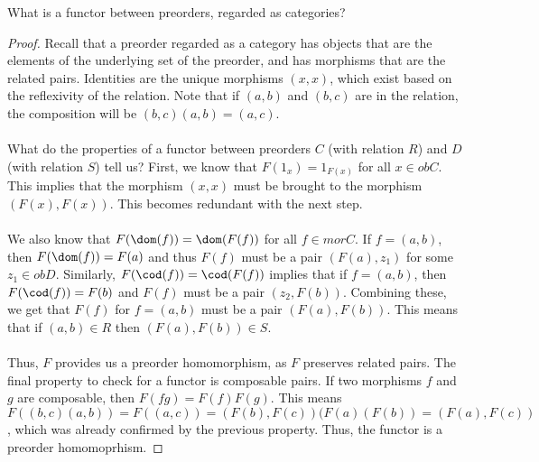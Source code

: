 \documentclass[main.tex]{subfiles}
\begin{document}

\begin{exercise}
	What is a functor between preorders, regarded as categories?
\end{exercise}

\begin{proof}
	Recall that a preorder regarded as a category has objects that are the
	elements of the underlying set of the preorder, and has morphisms that are
	the related pairs.  Identities are the unique morphisms $(x,x)$, which exist
	based on the reflexivity of the relation.  Note that if $(a,b)$ and $(b,c)$
	are in the relation, the composition will be $(b,c)(a,b) = (a,c)$.\\ \\ What
	do the properties of a functor between preorders $C$ (with relation $R$) and
	$D$ (with relation $S$) tell us?  First, we know that $F(1_x) = 1_{F(x)}$
	for all $x \in obC$.  This implies that the morphism $(x,x)$ must be brought
	to the morphism $(F(x),F(x))$.  This becomes redundant with the next step.
	\\ \\ We also know that $F(\dom(f)) = \dom(F(f))$ for all $f \in morC$.  If
	$f = (a,b)$, then $F(\dom(f)) = F(a)$ and thus $F(f)$ must be a pair $(F(a),
	z_1)$ for some $z_1 \in obD$.  Similarly, $F(\cod(f)) = \cod(F(f))$ implies
	that if $f = (a,b)$, then $F(\cod(f)) = F(b)$ and $F(f)$ must be a pair
	$(z_2,F(b))$.  Combining these, we get that $F(f)$ for $f = (a,b)$ must be a
	pair $(F(a),F(b))$.  This means that if $(a,b) \in R$  then $(F(a),F(b)) \in
	S$.  \\ \\ Thus, $F$ provides us a preorder homomorphism, as $F$ preserves
	related pairs.  The final property to check for a functor is composable
	pairs.  If two morphisms $f$ and $g$ are composable, then $F(fg) =
	F(f)F(g)$.  This means $F((b,c)(a,b)) = F((a,c)) = (F(b),F(c))(F(a)(F(b)) =
	(F(a),F(c))$, which was already confirmed by the previous property.  Thus,
	the functor is a preorder homomoprhism.
\end{proof}
\end{document}
